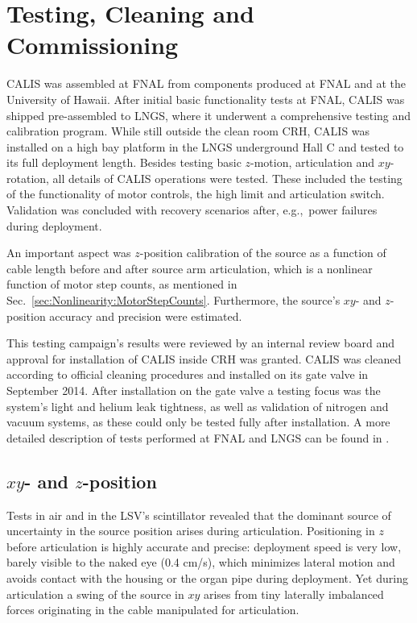 \section{Testing, Cleaning and Commissioning} \label{sec:Testing}\label{sec:Commissioning}
CALIS was assembled at FNAL from components produced at FNAL and at the University of Hawaii. After initial basic functionality tests at FNAL, CALIS was shipped pre-assembled to LNGS, where it underwent a comprehensive testing and calibration program. While still outside the clean room CRH, CALIS was installed on a high bay platform in the LNGS underground Hall C and tested to its full deployment length. Besides testing basic $z$-motion, articulation and $xy$-rotation, all details of CALIS operations were tested. These included the testing of the functionality of motor controls, the high limit and articulation switch. Validation was concluded with recovery scenarios after, e.g.,~power failures during deployment.

An important aspect was $z$-position calibration of the source as a function of cable length before and after source arm articulation, which is a nonlinear function of motor step counts, as mentioned in Sec.~\ref{sec:Nonlinearity:MotorStepCounts}. Furthermore, the source's $xy$- and $z$-position accuracy and precision were estimated.

This testing campaign's results were reviewed by an internal review board and approval for installation of CALIS inside CRH was granted. CALIS was cleaned according to official cleaning procedures and installed on its gate valve in September 2014.
After installation on the gate valve a testing focus was the system's light and helium leak tightness, as well as validation of nitrogen and vacuum systems, as these could only be tested fully after installation. A more detailed description of tests performed at FNAL and LNGS can be found in \cite{thesis:Hackett, thesis:Edkins}.

\subsection*{$xy$- and $z$-position}
Tests in air and in the LSV's scintillator revealed that the dominant source of uncertainty in the source position arises during articulation. Positioning in $z$ before articulation is highly accurate and precise: deployment speed is very low, barely visible to the naked eye (0.4 cm/s), which minimizes lateral motion and avoids contact with the housing or the organ pipe during deployment. Yet during articulation a swing of the source in $xy$ arises from tiny laterally imbalanced forces originating in the cable manipulated for articulation. 

